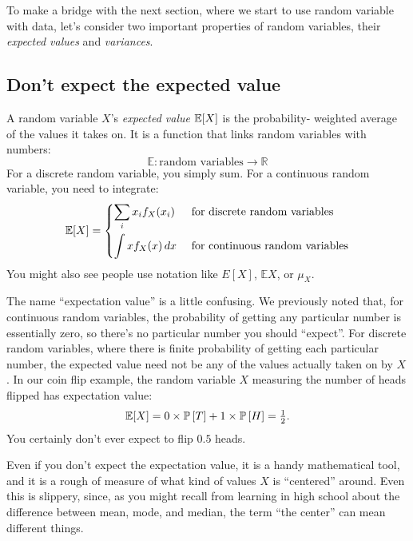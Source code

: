 To make a bridge with the next section, where we start to use random variable
with data, let's consider two important properties of random variables, their
\emph{expected values} and \emph{variances}.

\subsection{Don't expect the expected value}

A random variable $X$'s \emph{expected value} $\mathbb{E}\!\left[{X}\right]$ is the probability-
weighted average of the values it takes on. It is a function that links random
variables with numbers:
\begin{equation*}
\mathbb{E} : \text{random variables} \to \mathbb{R}
\end{equation*}
For a discrete random variable, you simply sum. For a continuous random
variable, you need to integrate:
\begin{equation}
\mathbb{E}\!\left[{X}\right] = \begin{dcases}
  \sum_i x_i f_X(x_i) & \text{ for discrete random variables} \\
  \int x f_X(x) \,dx & \text{ for continuous random variables}
\end{dcases}
\end{equation}
You might also see people use notation like $E[X]$, $\mathbb{E}X$, or $\mu_X$.


The name ``expectation value'' is a little confusing. We previously noted that,
for continuous random variables, the probability of getting any particular
number is essentially zero, so there's no particular number you should
``expect''. For discrete random variables, where there is finite probability
of getting each particular number, the expected value need not be any of the
values actually taken on by $X$. In our coin flip example, the random variable
$X$ measuring the number of heads flipped has expectation value:
\begin{equation}
\mathbb{E}\!\left[{X}\right] = 0 \times \mathbb{P}\left[{T}\right] + 1 \times \mathbb{P}\left[{H}\right] = \tfrac{1}{2}.
\end{equation}
You certainly don't ever expect to flip $0.5$ heads.

Even if you don't expect the expectation value, it is a handy mathematical
tool, and it is a rough of measure of what kind of values $X$ is ``centered''
around. Even this is slippery, since, as you might recall from learning in
high school about the difference between mean, mode, and median, the term ``the
center'' can mean different things.

